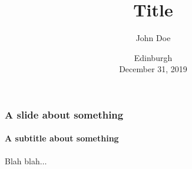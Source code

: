 \documentclass{beamer}
\begin{document}
\title{Title}
\author{John Doe}

\date{Edinburgh\\December 31, 2019}

\begin{frame}
  \titlepage
\end{frame}


\begin{frame}
  \frametitle{A slide about something}
  \framesubtitle{A subtitle about something}

  Blah blah$\ldots$
\end{frame}
\end{document}
